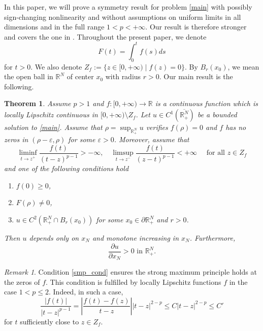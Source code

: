 \documentclass[reqno]{amsart}
\theoremstyle{plain}
\newtheorem{theorem}{Theorem}
\theoremstyle{definition}
\theoremstyle{remark}
\newtheorem{remark}{Remark}
\begin{document}
	In this paper, we will prove a symmetry result for problem \eqref{main} with possibly sign-changing nonlinearity and without assumptions on uniform limits in all dimensions and in the full range $1<p<+\infty$.
	Our result is therefore stronger and covers the one in \cite{MR4771444}.
	Throughout the present paper, we denote
	\[
	F(t)=\int_{0}^{t} f(s) ds
	\]
	for $t>0$. We also denote $Z_f:=\{z\in[0,+\infty) \mid f(z)=0\}$. By $B_r(x_0)$, we mean the open ball in $\mathbb{R}^N$ of center $x_0$ with radius $r>0$. Our main result is the following.
	
	\begin{theorem}\label{th:main}
		Assume $p>1$ and $f:[0,+\infty)\to\mathbb{R}$ is a continuous function which is locally Lipschitz continuous in $[0,+\infty)\setminus Z_f$. Let $u\in C^1(\overline{\mathbb{R}^N_+})$ be a bounded solution to \eqref{main}. Assume that $\rho=\sup_{\mathbb{R}^N_+} u$ verifies $f(\rho)=0$ and $f$ has no zeros in $(\rho-\varepsilon,\rho)$ for some $\varepsilon>0$. Moreover, assume that		
		\begin{equation}\label{smp_cond}
			\liminf_{t\to z^+} \frac{f(t)}{(t-z)^{p-1}} > -\infty,\quad
			\limsup_{t\to z^-} \frac{f(t)}{(z-t)^{p-1}} < +\infty
			\quad\text{ for all } z\in Z_f
		\end{equation}
		and one of the following conditions hold
		\begin{enumerate}
			\item[(i)] $f(0)\ge0$,
			\item[(ii)] $F(\rho)\ne0$,
			\item[(iii)] $u\in C^2(\mathbb{R}^N_+\cap B_r(x_0))$ for some $x_0\in\partial\mathbb{R}^N_+$ and $r>0$.
		\end{enumerate}
		Then $u$ depends only on $x_N$ and monotone increasing in $x_N$. Furthermore,
		\begin{equation}\label{deri}
			\frac{\partial u}{\partial x_N} > 0 \text{ in } \mathbb{R}^N_+.
		\end{equation}
	\end{theorem}
	
	\begin{remark}		
		Condition \eqref{smp_cond} ensures the strong maximum principle holds at the zeros of $f$. This condition is fulfilled by locally Lipschitz functions $f$ in the case $1<p\le2$. Indeed, in such a case,
		\[
		\frac{|f(t)|}{|t-z|^{p-1}} = \left|\frac{f(t)-f(z)}{t-z}\right| |t-z|^{2-p} \le C |t-z|^{2-p} \le C'
		\]
		for $t$ sufficiently close to $z \in Z_f$.
	\end{remark}
	
\end{document}
